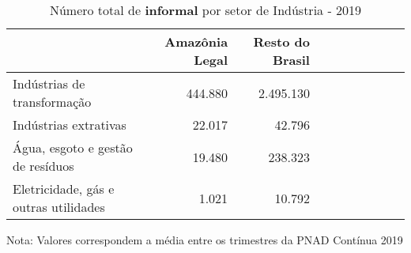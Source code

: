\begin{table}[H]
\centering
\label{\_retrato\_emprego\_setor\_spap\_industria\_table\_n\_de\_informal}
\begin{threeparttable}
\caption{Número total de \textbf{informal} por setor de Indústria - 2019}
\begin{tabular}{l*{3}{rrr}}
\midrule \midrule
                    &Amazônia Legal&Resto do Brasil\\
\midrule
Indústrias de transformação&     444.880&   2.495.130\\
Indústrias extrativas&      22.017&      42.796\\
Água, esgoto e gestão de resíduos&      19.480&     238.323\\
Eletricidade, gás e outras utilidades&       1.021&      10.792\\
\bottomrule
\end{tabular}
\begin{tablenotes}
\scriptsize{Nota: Valores correspondem a média entre os trimestres da PNAD Contínua 2019}
\end{tablenotes}
\end{threeparttable}
\end{table}
